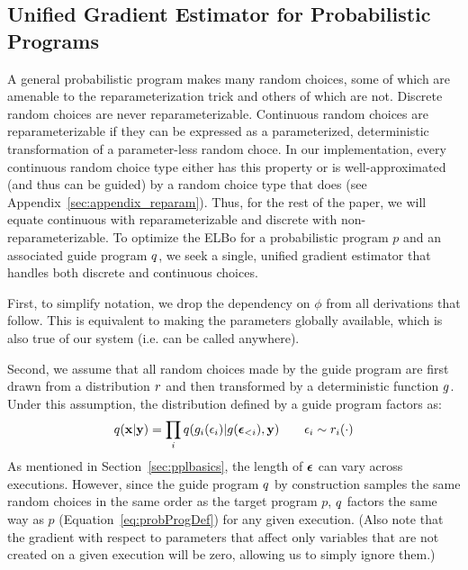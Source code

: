 \subsection{Unified Gradient Estimator for Probabilistic Programs}
\label{sec:optimization:unifiedEstimator}

A general probabilistic program makes many random choices, some of which are amenable to the reparameterization trick and others of which are not.
Discrete random choices are never reparameterizable. Continuous random choices are reparameterizable if they can be expressed as a parameterized, deterministic transformation of a parameter-less random choce. In our implementation, every continuous random choice type either has this property or is well-approximated (and thus can be guided) by a random choice type that does (see Appendix~\ref{sec:appendix_reparam}). Thus, for the rest of the paper, we will equate  continuous with reparameterizable and discrete with non-reparameterizable.
To optimize the ELBo for a probabilistic program $p$ and an associated guide program $q$, we seek a single, unified gradient estimator that handles both discrete and continuous choices.

First, to simplify notation, we drop the dependency on $\phi$ from all derivations that follow. This is equivalent to making the parameters globally available, which is also true of our system (i.e.  can be called anywhere).

Second, we assume that all random choices made by the guide program are first drawn from a distribution $r$ and then transformed by a deterministic function $g$. Under this assumption, the distribution defined by a guide program factors as:
\begin{equation*}
q(\mathbf{x} | \mathbf{y}) = \prod_i q(g_i(\epsilon_i) | g(\bm{\epsilon}_{<i}), \mathbf{y}) \hspace{2em} \epsilon_i \sim r_i(\cdot)
\end{equation*}
As mentioned in Section~\ref{sec:pplbasics}, the length of $\bm{\epsilon}$ can vary across executions. However, since the guide program $q$ by construction samples the same random choices in the same order as the target program $p$, $q$ factors the same way as $p$ (Equation~\ref{eq:probProgDef}) for any given execution. 
(Also note that the gradient with respect to parameters that affect only variables that are not created on a given execution will be zero, allowing us to simply ignore them.)

